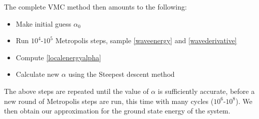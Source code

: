 \documentclass[english, a4paper]{article}
\begin{document}
The complete VMC method then amounts to the following:
\begin{itemize}
 \item Make initial guess $\alpha_0$
 \item Run $10^4$-$10^5$ Metropolis steps, sample \eqref{waveenergy} and \eqref{wavederivative}
 \item Compute \eqref{localenergyalpha} 
 \item Calculate new $\alpha$ using the Steepest descent method
\end{itemize}
The above steps are repeated until the value of $\alpha$ is sufficiently accurate, before a new round of
Metropolis steps are run, this time with many cycles ($10^6$-$10^8$). We then obtain our approximation
for the ground state energy of the system.\\
\end{document}
